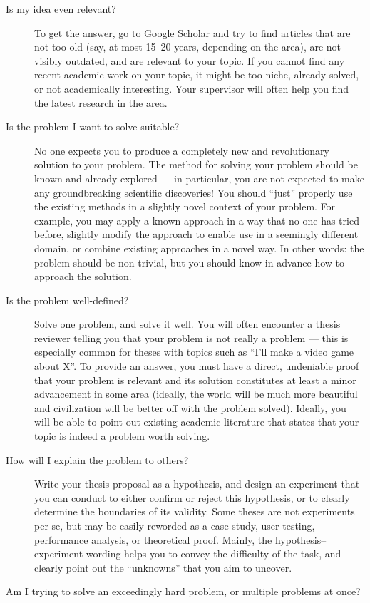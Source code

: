 \begin{description}
\item[Is my idea even relevant?]
To get the answer, go to Google Scholar and try to find articles that are not too old (say, at most 15--20 years, depending on the area), are not visibly outdated, and are relevant to your topic. If you cannot find any recent academic work on your topic, it might be too niche, already solved, or not academically interesting. Your supervisor will often help you find the latest research in the area.
\item[Is the problem I want to solve suitable?]
No one expects you to produce a completely new and revolutionary solution to your problem. The method for solving your problem should be known and already explored --- in particular, you are not expected to make any groundbreaking scientific discoveries! You should ``just'' properly use the existing methods in a slightly novel context of your problem. For example, you may apply a known approach in a way that no one has tried before, slightly modify the approach to enable use in a seemingly different domain, or combine existing approaches in a novel way. In other words: the problem should be non-trivial, but you should know in advance how to approach the solution.
\item[Is the problem well-defined?]
Solve one problem, and solve it well. You will often encounter a thesis reviewer telling you that your problem is not really a problem --- this is especially common for theses with topics such as ``I'll make a video game about X''. To provide an answer, you must have a direct, undeniable proof that your problem is relevant and its solution constitutes at least a minor advancement in some area (ideally, the world will be much more beautiful and civilization will be better off with the problem solved). Ideally, you will be able to point out existing academic literature that states that your topic is indeed a problem worth solving.
\item[How will I explain the problem to others?]
Write your thesis proposal as a hypothesis, and design an experiment that you can conduct to either confirm or reject this hypothesis, or to clearly determine the boundaries of its validity. Some theses are not experiments per se, but may be easily reworded as a case study, user testing, performance analysis, or theoretical proof. Mainly, the hypothesis--experiment wording helps you to convey the difficulty of the task, and clearly point out the ``unknowns'' that you aim to uncover.
\item[Am I trying to solve an exceedingly hard problem, or multiple problems at once?]

\end{description}
